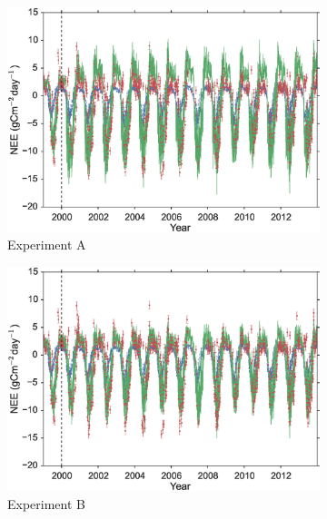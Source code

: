 \documentclass[review]{elsarticle}
\begin{document}
\begin{figure}
    \centering
    \begin{subfigure}[b]{0.49\textwidth}
        \includegraphics[width=\textwidth]{A4dvar.eps}
        \caption{Experiment A}
        \label{fig:4dvardiagBR}
    \end{subfigure}
    \begin{subfigure}[b]{0.49\textwidth}
        \includegraphics[width=\textwidth]{B4dvar.eps}
        \caption{Experiment B}
        \label{fig:4dvaredcBR}
    \end{subfigure}
    \begin{subfigure}[b]{0.49\textwidth}

\end{subfigure}
\end{figure}
\end{document}
